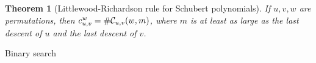 \documentclass{elsarticle}
\newtheorem{theorem}{Theorem}[section]
\theoremstyle{definition}
\theoremstyle{remark}
\numberwithin{equation}{subsection}
\DeclareMathOperator{\sch}{\mathfrak{S}}
\newcommand{\code}{\mathfrak{c}}
\begin{document}





\begin{theorem}[Littlewood-Richardson rule for Schubert polynomials]
	If $u, v, w$ are permutations, then $c_{u,v}^w=\#\mathcal{C}_{u,v}(w,m)$, where $m$ is at least as large as the last descent of $u$ and the last descent of $v$.
\end{theorem}

Binary search





%
\end{document}
